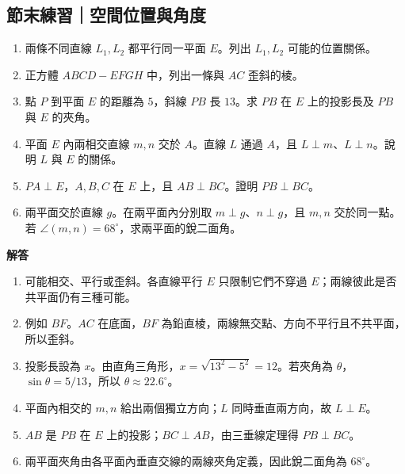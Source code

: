 \documentclass[11pt,a4paper]{article}
\providecommand{\tightlist}{%
  \setlength{\itemsep}{0pt}\setlength{\parskip}{0pt}}
\begin{document}
\begin{HandoutSelfCheck}

\subsection{節末練習｜空間位置與角度}\label{ux7bc0ux672bux7df4ux7fd2ux7a7aux9593ux4f4dux7f6eux8207ux89d2ux5ea6}

\begin{enumerate}
\def\labelenumi{\arabic{enumi}.}
\tightlist
\item
  兩條不同直線 \(L_1,L_2\) 都平行同一平面 \(E\)。列出 \(L_1,L_2\) 可能的位置關係。
\item
  正方體 \(ABCD-EFGH\) 中，列出一條與 \(AC\) 歪斜的棱。
\item
  點 \(P\) 到平面 \(E\) 的距離為 \(5\)，斜線 \(PB\) 長 \(13\)。求 \(PB\) 在 \(E\) 上的投影長及 \(PB\) 與 \(E\) 的夾角。
\item
  平面 \(E\) 內兩相交直線 \(m,n\) 交於 \(A\)。直線 \(L\) 通過 \(A\)，且 \(L\perp m\)、\(L\perp n\)。說明 \(L\) 與 \(E\) 的關係。
\item
  \(PA\perp E\)，\(A,B,C\) 在 \(E\) 上，且 \(AB\perp BC\)。證明 \(PB\perp BC\)。
\item
  兩平面交於直線 \(g\)。在兩平面內分別取 \(m\perp g\)、\(n\perp g\)，且 \(m,n\) 交於同一點。若 \(\angle(m,n)=68^\circ\)，求兩平面的銳二面角。
\end{enumerate}

\textbf{解答}

\begin{enumerate}
\def\labelenumi{\arabic{enumi}.}
\tightlist
\item
  可能相交、平行或歪斜。各直線平行 \(E\) 只限制它們不穿過 \(E\)；兩線彼此是否共平面仍有三種可能。
\item
  例如 \(BF\)。\(AC\) 在底面，\(BF\) 為鉛直棱，兩線無交點、方向不平行且不共平面，所以歪斜。
\item
  投影長設為 \(x\)。由直角三角形，\(x=\sqrt{13^2-5^2}=12\)。若夾角為 \(\theta\)，\(\sin\theta=5/13\)，所以 \(\theta\approx22.6^\circ\)。
\item
  平面內相交的 \(m,n\) 給出兩個獨立方向；\(L\) 同時垂直兩方向，故 \(L\perp E\)。
\item
  \(AB\) 是 \(PB\) 在 \(E\) 上的投影；\(BC\perp AB\)，由三垂線定理得 \(PB\perp BC\)。
\item
  兩平面夾角由各平面內垂直交線的兩線夾角定義，因此銳二面角為 \(68^\circ\)。
\end{enumerate}

\end{HandoutSelfCheck}
\end{document}
